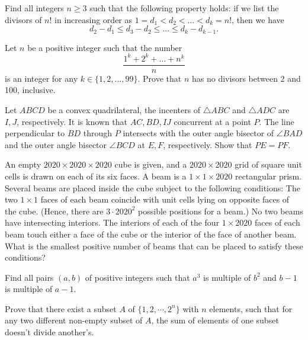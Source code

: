 \documentclass[11pt]{scrartcl}
\begin{document}
\begin{problem}[4298196647118074747]
	Find all integers $n \geq 3$ such that the following property holds: if we list the divisors of $n!$ in increasing order as $1 = d_1 < d_2 < \dots < d_k = n!$, then we have
\[ d_2 - d_1 \leq d_3 - d_2 \leq \dots \leq d_k - d_{k-1}. \]
\end{problem}
\begin{problem}[4306507392377162131]
Let $n$ be a positive integer such that the number
\[\frac{1^k + 2^k + \dots + n^k}{n}\]is an integer for any $k \in \{1, 2, \dots, 99\}$. Prove that $n$ has no divisors between 2 and 100, inclusive.
\end{problem}
\begin{problem}[4308913658510445082]
Let $ABCD$ be a convex quadrilateral, the incenters of $\triangle ABC$ and $\triangle ADC$ are $I,J$, respectively. It is known that $AC,BD,IJ$ concurrent at a point $P$. The line perpendicular to $BD$ through $P$ intersects with the outer angle bisector of $\angle BAD$ and the outer angle bisector $\angle BCD$ at $E,F$, respectively. Show that $PE=PF$.
\end{problem}
\begin{problem}[4320337590540710547]
	An empty $2020 \times 2020 \times 2020$ cube is given, and a $2020 \times 2020$ grid of square unit cells is drawn on each of its six faces. A beam is a $1 \times 1 \times 2020$ rectangular prism. Several beams are placed inside the cube subject to the following conditions:
The two $1 \times 1$ faces of each beam coincide with unit cells lying on opposite faces of the cube. (Hence, there are $3 \cdot {2020}^2$ possible positions for a beam.)
No two beams have intersecting interiors.
The interiors of each of the four $1 \times 2020$ faces of each beam touch either a face of the cube or the interior of the face of another beam.
What is the smallest positive number of beams that can be placed to satisfy these conditions?
\end{problem}
\begin{problem}[4330093832251809273]
Find all pairs $(a,b)$ of positive integers such that $a^3$ is multiple of $b^2$ and $b-1$ is multiple of $a-1$.
\end{problem}
\begin{problem}[4356163030131244205]
	Prove that there exist a subset $A$ of $\{1,2,\cdots,2^n\}$ with $n$ elements, such that for any two different non-empty subset of $A$, the sum of elements of one subset doesn't divide another's.
\end{problem}
\end{document}
